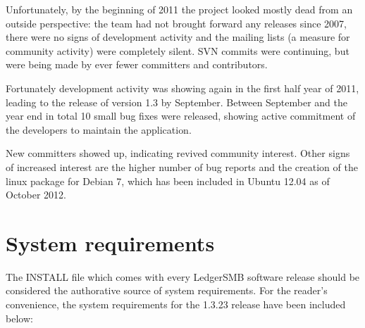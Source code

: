 Unfortunately, by the beginning of 2011 the project looked mostly dead from
an outside perspective: the team had not brought forward any releases since
2007, there were no signs of development activity and the
mailing lists (a measure for community activity) were
completely silent.  SVN commits were continuing, but were being made by ever 
fewer committers and contributors.

Fortunately development activity was showing again in the first half 
year of 2011,
leading to the release of version 1.3 by September.  Between September and the
year end in total 10 small bug fixes were released, showing active commitment
of the developers to maintain the application.

New committers showed up, indicating revived community interest. Other signs of
increased interest are the higher number of bug reports and the creation of the
linux package for Debian 7, which has been included in Ubuntu 12.04 as of
October 2012.



\section{System requirements}

The INSTALL file which comes with every LedgerSMB software release should be
considered the authorative source of system requirements.  For the reader's
convenience, the system requirements for the 1.3.23 release have been included
below:

